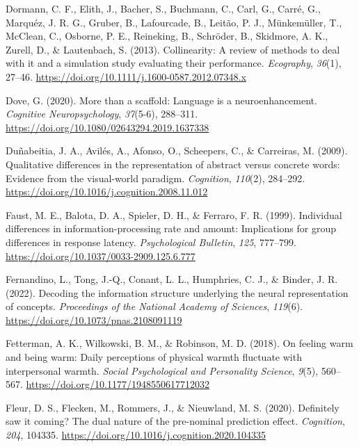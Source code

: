 \documentclass[
  12pt,
  man,floatsintext]{apa7}
\newlength{\cslhangindent}
\newlength{\cslentryspacingunit} %
\newenvironment{CSLReferences}[2] %
 {%
  \setlength{\parindent}{0pt}
  \ifodd #1
  \let\oldpar\par
  \def\par{\hangindent=\cslhangindent\oldpar}
  \fi
  \setlength{\parskip}{#2\cslentryspacingunit}
 }%
 {}
\begin{document}
\begin{CSLReferences}{1}{0}
\leavevmode{}%
Dormann, C. F., Elith, J., Bacher, S., Buchmann, C., Carl, G., Carré, G., Marquéz, J. R. G., Gruber, B., Lafourcade, B., Leitão, P. J., Münkemüller, T., McClean, C., Osborne, P. E., Reineking, B., Schröder, B., Skidmore, A. K., Zurell, D., \& Lautenbach, S. (2013). Collinearity: A review of methods to deal with it and a simulation study evaluating their performance. \emph{Ecography}, \emph{36}(1), 27--46. \url{https://doi.org/10.1111/j.1600-0587.2012.07348.x}

\leavevmode{}%
Dove, G. (2020). More than a scaffold: {Language} is a neuroenhancement. \emph{Cognitive Neuropsychology}, \emph{37}(5-6), 288--311. \url{https://doi.org/10.1080/02643294.2019.1637338}

\leavevmode{}%
Duñabeitia, J. A., Avilés, A., Afonso, O., Scheepers, C., \& Carreiras, M. (2009). Qualitative differences in the representation of abstract versus concrete words: {Evidence} from the visual-world paradigm. \emph{Cognition}, \emph{110}(2), 284--292. \url{https://doi.org/10.1016/j.cognition.2008.11.012}

\leavevmode{}%
Faust, M. E., Balota, D. A., Spieler, D. H., \& Ferraro, F. R. (1999). Individual differences in information-processing rate and amount: {Implications} for group differences in response latency. \emph{Psychological Bulletin}, \emph{125}, 777--799. \url{https://doi.org/10.1037/0033-2909.125.6.777}

\leavevmode{}%
Fernandino, L., Tong, J.-Q., Conant, L. L., Humphries, C. J., \& Binder, J. R. (2022). Decoding the information structure underlying the neural representation of concepts. \emph{Proceedings of the National Academy of Sciences}, \emph{119}(6). \url{https://doi.org/10.1073/pnas.2108091119}

\leavevmode{}%
Fetterman, A. K., Wilkowski, B. M., \& Robinson, M. D. (2018). On feeling warm and being warm: {Daily} perceptions of physical warmth fluctuate with interpersonal warmth. \emph{Social Psychological and Personality Science}, \emph{9}(5), 560--567. \url{https://doi.org/10.1177/1948550617712032}

\leavevmode{}%
Fleur, D. S., Flecken, M., Rommers, J., \& Nieuwland, M. S. (2020). Definitely saw it coming? {The} dual nature of the pre-nominal prediction effect. \emph{Cognition}, \emph{204}, 104335. \url{https://doi.org/10.1016/j.cognition.2020.104335}


\end{CSLReferences}
\end{document}
